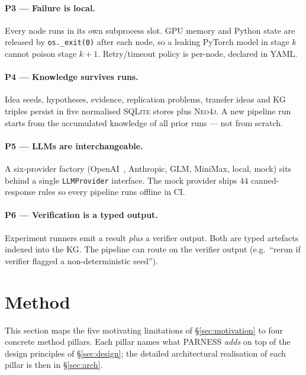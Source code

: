 \documentclass{article}
\newcommand{\parness}{\textsf{PARNESS}}
\newcommand{\code}[1]{\texttt{\small #1}}
\begin{document}
\paragraph{P3 --- Failure is local.}
Every node runs in its own subprocess slot. GPU memory and Python state
are released by \code{os.\_exit(0)} after each node, so a leaking PyTorch
model in stage $k$ cannot poison stage $k{+}1$. Retry/timeout policy is
per-node, declared in YAML.

\paragraph{P4 --- Knowledge survives runs.}
Idea seeds, hypotheses, evidence, replication problems, transfer ideas
and KG triples persist in five normalised \textsc{SQLite} stores plus
\textsc{Neo4j}. A new pipeline run starts from the accumulated knowledge
of all prior runs --- not from scratch.

\paragraph{P5 --- LLMs are interchangeable.}
A six-provider factory (OpenAI~\cite{gpt4}, Anthropic, GLM, MiniMax, local,
mock) sits behind a single \code{LLMProvider} interface. The mock provider
ships $44$ canned-response rules so every pipeline runs offline in CI.

\paragraph{P6 --- Verification is a typed output.}
Experiment runners emit a result \emph{plus} a verifier output. Both are
typed artefacts indexed into the KG. The pipeline can route on the
verifier output (e.g.\ ``rerun if verifier flagged a non-deterministic
seed'').

\section{Method}
\label{sec:method}

This section maps the five motivating limitations of \S\ref{sec:motivation}
to four concrete method pillars. Each pillar names what \parness{}
\emph{adds} on top of the design principles of \S\ref{sec:design}; the
detailed architectural realisation of each pillar is then in
\S\ref{sec:arch}.
\end{document}
